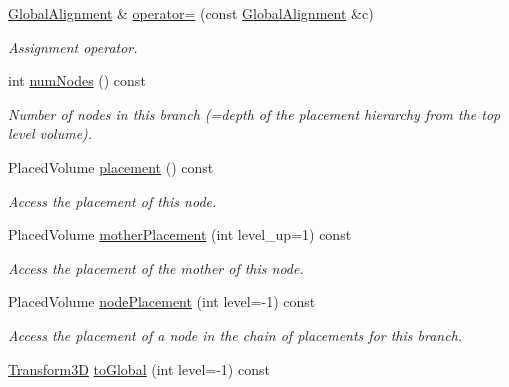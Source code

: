 \begin{DoxyCompactItemize}
\hyperlink{class_d_d4hep_1_1_alignments_1_1_global_alignment}{GlobalAlignment} \& \hyperlink{class_d_d4hep_1_1_alignments_1_1_global_alignment_a723fc5d2669d586790c48ff820880171}{operator=} (const \hyperlink{class_d_d4hep_1_1_alignments_1_1_global_alignment}{GlobalAlignment} \&c)
\begin{DoxyCompactList}\small\item\em Assignment operator. \item\end{DoxyCompactList}\item 
int \hyperlink{class_d_d4hep_1_1_alignments_1_1_global_alignment_a1dba2022e2a869a16901a9606c629d57}{numNodes} () const 
\begin{DoxyCompactList}\small\item\em Number of nodes in this branch (=depth of the placement hierarchy from the top level volume). \item\end{DoxyCompactList}\item 
PlacedVolume \hyperlink{class_d_d4hep_1_1_alignments_1_1_global_alignment_a4445f18516ca144ef79493f15b4042cf}{placement} () const 
\begin{DoxyCompactList}\small\item\em Access the placement of this node. \item\end{DoxyCompactList}\item 
PlacedVolume \hyperlink{class_d_d4hep_1_1_alignments_1_1_global_alignment_a8378dc0dd2250e04561f21a452e0ee5d}{motherPlacement} (int level\_\-up=1) const 
\begin{DoxyCompactList}\small\item\em Access the placement of the mother of this node. \item\end{DoxyCompactList}\item 
PlacedVolume \hyperlink{class_d_d4hep_1_1_alignments_1_1_global_alignment_a74a90943af3e537f040e4bd22b738046}{nodePlacement} (int level=-\/1) const 
\begin{DoxyCompactList}\small\item\em Access the placement of a node in the chain of placements for this branch. \item\end{DoxyCompactList}\item 
\hyperlink{class_d_d4hep_1_1_alignments_1_1_global_alignment_a328240cbc53ba92424336a5898ba49d3}{Transform3D} \hyperlink{class_d_d4hep_1_1_alignments_1_1_global_alignment_ab9ed5fdc920cd4d8ed4303096aaec174}{toGlobal} (int level=-\/1) const 

\end{DoxyCompactItemize}
